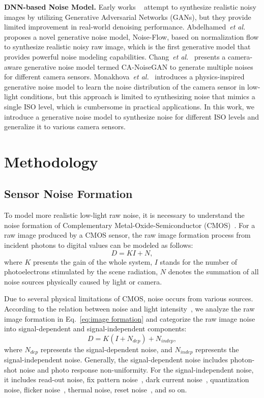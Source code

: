 \documentclass[10pt,twocolumn,letterpaper]{article}
\def\etal{{\it{et al.}}}
\begin{document}
\textbf{DNN-based Noise Model.} Early works ~\cite{chen2018image, kim2019grdn} attempt to synthesize realistic noisy images by utilizing Generative Adversarial Networks (GANs), but they provide limited improvement in real-world denoising performance. Abdelhamed~\etal~\cite{abdelhamed2019noise} proposes a novel generative noise model, Noise-Flow, based on normalization flow to synthesize realistic noisy raw image, which is the first generative model that provides powerful noise modeling capabilities. Chang~\etal~\cite{chang2020learning} presents a camera-aware generative noise model termed CA-NoiseGAN to generate multiple noises for different camera sensors. Monakhova~\etal~\cite{monakhova2022dancing} introduces a physics-inspired generative noise model to learn the noise distribution of the camera sensor in low-light conditions, but this approach is limited to synthesizing noise that mimics a single ISO level, which is cumbersome in practical applications. In this work, we introduce a generative noise model to synthesize noise for different ISO levels and generalize it to various camera sensors.

\section{Methodology}
\label{method}
\subsection{Sensor Noise Formation}
To model more realistic low-light raw noise, it is necessary to understand the noise formation of Complementary Metal-Oxide-Semiconductor (CMOS)~\cite{cmosmarket}. For a raw image produced by a CMOS sensor, the raw image formation process from incident photons to digital values can be modeled as follows:
\begin{equation}
    D = KI+N\label{eq:image formation} ,
\end{equation}
\noindent where $K$ presents the gain of the whole system, $I$ stands for the number of photoelectrons stimulated by the scene radiation, $N$ denotes the summation of all noise sources physically caused by light or camera.

Due to several physical limitations of CMOS, noise occurs from various sources. According to the relation between noise and light intensity~\cite{healey1994radiometric,el2005cmos, farrell2008sensor}, we analyze the raw image formation in Eq.~\eqref{eq:image formation} and categorize the raw image noise into signal-dependent and signal-independent components:
\begin{equation}
    D = K(I+N_{dep})+N_{indep}\label{eq:noise formation} ,
\end{equation}
\noindent where $N_{dep}$ represents the signal-dependent noise, and $N_{indep}$ represents the signal-independent noise. Generally, the signal-dependent noise includes photon-shot noise and photo response non-uniformity. For the signal-independent noise, it includes read-out noise, fix pattern noise~\cite{snoeij2006cmos}, dark current noise~\cite{baer2006model}, quantization noise, flicker noise~\cite{barnes1966statistical}, thermal noise, reset noise~\cite{konnik2014high}, and so on.
\end{document}
